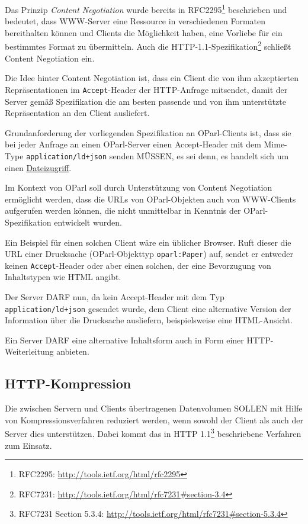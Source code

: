\documentclass[,a4paper]{article}
\begin{document}
Das Prinzip \emph{Content Negotiation} wurde bereits in
RFC2295\footnote{RFC2295: \url{http://tools.ietf.org/html/rfc2295}}
beschrieben und bedeutet, dass WWW-Server eine Ressource in
verschiedenen Formaten bereithalten können und Clients die Möglichkeit
haben, eine Vorliebe für ein bestimmtes Format zu übermitteln. Auch die
HTTP-1.1-Spezifikation\footnote{RFC7231:
  \url{http://tools.ietf.org/html/rfc7231\#section-3.4}} schließt
Content Negotiation ein.

Die Idee hinter Content Negotiation ist, dass ein Client die von ihm
akzeptierten Repräsentationen im \texttt{Accept}-Header der HTTP-Anfrage
mitsendet, damit der Server gemäß Spezifikation die am besten passende
und von ihm unterstützte Repräsentation an den Client ausliefert.

Grundanforderung der vorliegenden Spezifikation an OParl-Clients ist,
dass sie bei jeder Anfrage an einen OParl-Server einen Accept-Header mit
dem Mime-Type \texttt{application/ld+json} senden MÜSSEN, es sei denn,
es handelt sich um einen \hyperref[dateizugriff]{Dateizugriff}.

Im Kontext von OParl soll durch Unterstützung von Content Negotiation
ermöglicht werden, dass die URLs von OParl-Objekten auch von WWW-Clients
aufgerufen werden können, die nicht unmittelbar in Kenntnis der
OParl-Spezifikation entwickelt wurden.

Ein Beispiel für einen solchen Client wäre ein üblicher Browser. Ruft
dieser die URL einer Drucksache (OParl-Objekttyp \texttt{oparl:Paper})
auf, sendet er entweder keinen \texttt{Accept}-Header oder aber einen
solchen, der eine Bevorzugung von Inhaltstypen wie HTML angibt.

Der Server DARF nun, da kein Accept-Header mit dem Typ
\texttt{application/ld+json} gesendet wurde, dem Client eine alternative
Version der Information über die Drucksache ausliefern, beispielsweise
eine HTML-Ansicht.

Ein Server DARF eine alternative Inhaltsform auch in Form einer
HTTP-Weiterleitung anbieten.

\subsection{HTTP-Kompression}\label{http-kompression}

Die zwischen Servern und Clients übertragenen Datenvolumen SOLLEN mit
Hilfe von Kompressionsverfahren reduziert werden, wenn sowohl der Client
als auch der Server dies unterstützen. Dabei kommt das in HTTP
1.1\footnote{RFC7231 Section 5.3.4:
  \url{http://tools.ietf.org/html/rfc7231\#section-5.3.4}} beschriebene
Verfahren zum Einsatz.
\end{document}
